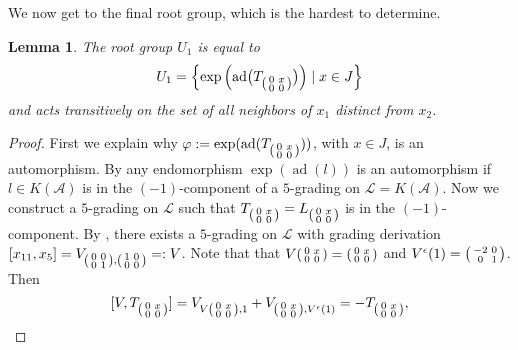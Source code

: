 \documentclass[oneside,a4paper]{amsart} %
\newtheorem{lemma}[theorem]{Lemma}
\theoremstyle{definition}
\DeclareMathOperator{\ad}{ad}
\newcommand{\A}{\mathcal{A}}
\newcommand{\LL}{\mathcal{L}}
\numberwithin{equation}{section}
\begin{document}
We now get to the final root group, which is the hardest to determine.
\begin{lemma}
\label{Hexagon U1}
	The root group $U_1$ is equal to
	\[ U_1 = \left\{ \exp \left( \ad \bigl( T_{\begin{psmallmatrix} 0&x\\0&0 \end{psmallmatrix}} \bigr) \right) \mid x\in J \right\} \]
	and acts transitively on the set of all neighbors of $x_1$ distinct from $x_2$.
\end{lemma}
\begin{proof}
	First we explain why $\varphi := \exp(\ad(T_{\begin{psmallmatrix} 0&x\\0&0 \end{psmallmatrix}}))$, with $x\in J$, is an automorphism.
	By \cite[Theorem 2.13, Theorem 3.4]{Stavrova2017} any endomorphism $\exp(\ad(l))$ is an automorphism if $l\in K(\A)$ is in the $(-1)$-component of a $5$-grading on $\LL=K(\A)$.
	Now we construct a $5$-grading on $\LL$ such that $T_{\begin{psmallmatrix} 0&x\\0&0 \end{psmallmatrix}}=L_{\begin{psmallmatrix} 0&x\\0&0 \end{psmallmatrix}}$ is in the $(-1)$-component.
	By \cite[Proposition 22]{Cohen2006}, there exists a $5$-grading on $\LL$ with grading derivation $[x_{11},x_5]=V_{\begin{psmallmatrix} 0&0\\0&1 \end{psmallmatrix},\begin{psmallmatrix} 1&0\\0&0 \end{psmallmatrix}}=:V$.
	Note that that $V \begin{psmallmatrix} 0&x\\0&0 \end{psmallmatrix}=\begin{psmallmatrix} 0&x\\0&0 \end{psmallmatrix}$ and $V^\epsilon (1)=\begin{psmallmatrix} -2&0\\0&1 \end{psmallmatrix}$.
	Then 
	\[ [V,T_{\begin{psmallmatrix} 0&x\\0&0 \end{psmallmatrix}}]=V_{V\begin{psmallmatrix} 0&x\\0&0 \end{psmallmatrix},1}+V_{\begin{psmallmatrix} 0&x\\0&0 \end{psmallmatrix},V^\epsilon(1)}=-T_{\begin{psmallmatrix} 0&x\\0&0 \end{psmallmatrix}},\] 

\end{proof}
\end{document}
